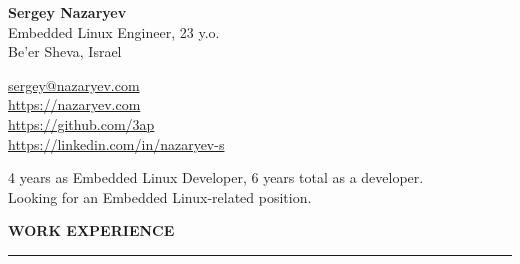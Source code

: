 \documentclass[hidelinks]{resume} %
\begin{document}
\begin{minipage}[t]{0.70\textwidth}
{\Huge \textbf{Sergey Nazaryev}}\vspace{2mm}\\
{Embedded Linux Engineer, 23 y.o.}\\
{Be'er Sheva, Israel \vspace{2mm}}\\

\end{minipage}
\begin{minipage}[t]{0.82\textwidth}
\vspace{-5mm}
{\small \faEnvelopeO} {\small \href{mailto:sergey@nazaryev.com}{sergey@nazaryev.com}}\\
{\small \faLink} {\small \href{https://nazaryev.com}{https://nazaryev.com}}\\
{\small \faGithub} {\small \href{https://github.com/3ap}{https://github.com/3ap}}\\
{\small \faLinkedin} {\small \href{https://www.linkedin.com/in/nazaryev-s/}{https://linkedin.com/in/nazaryev-s}}
\end{minipage} \vspace{-7mm}

{\small
4 years as Embedded Linux Developer, 6 years total as a developer.\\
Looking for an Embedded Linux-related position.
}


\sectionskip
\MakeUppercase{\bf Work experience}
\sectionlineskip
\hrule
\end{document}
